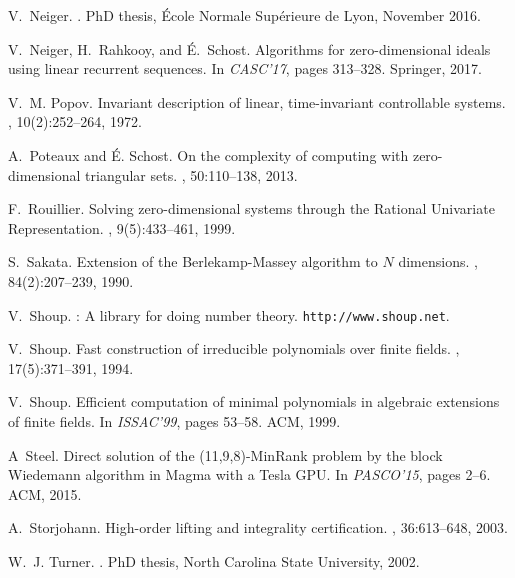 \documentclass[12pt]{article}
\begin{document}
\begin{thebibliography}{10}
V.~Neiger.
.
\newblock PhD thesis, {{\'E}cole Normale Sup{\'e}rieure de Lyon}, November
  2016.

V.~Neiger, H.~Rahkooy, and {\'{E}}.~Schost.
\newblock Algorithms for zero-dimensional ideals using linear recurrent
  sequences.
\newblock In {\em CASC'17}, pages 313--328. Springer, 2017.

V.~M. Popov.
\newblock Invariant description of linear, time-invariant controllable systems.
, 10(2):252--264, 1972.

A.~Poteaux and \'E. Schost.
\newblock On the complexity of computing with zero-dimensional triangular sets.
, 50:110--138, 2013.

F.~Rouillier.
\newblock Solving zero-dimensional systems through the {R}ational {U}nivariate
  {R}epresentation.
, 9(5):433--461, 1999.

S.~Sakata.
\newblock Extension of the {B}erlekamp-{M}assey algorithm to {$N$} dimensions.
, 84(2):207--239, 1990.

V.~Shoup.
: A library for doing number theory.
\newblock \texttt{http://www.shoup.net}.

V.~Shoup.
\newblock Fast construction of irreducible polynomials over finite fields.
, 17(5):371--391, 1994.

V.~Shoup.
\newblock Efficient computation of minimal polynomials in algebraic extensions
  of finite fields.
\newblock In {\em ISSAC'99}, pages 53--58. ACM, 1999.

A~Steel.
\newblock Direct solution of the (11,9,8)-{M}in{R}ank problem by the block
  {W}iedemann algorithm in {M}agma with a {T}esla {GPU}.
\newblock In {\em PASCO'15}, pages 2--6. ACM, 2015.

A.~Storjohann.
\newblock High-order lifting and integrality certification.
, 36:613--648, 2003.

W.~J. Turner.
.
\newblock PhD thesis, {North Carolina State University}, 2002.


\end{thebibliography}
\end{document}
